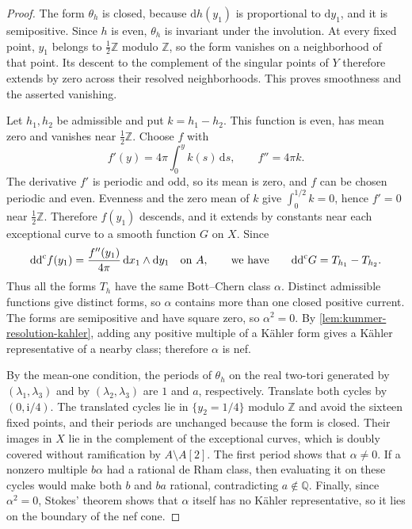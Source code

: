 \begin{proof}
The form $\theta_h$ is closed, because $\mathrm dh(y_1)$ is proportional to $\mathrm dy_1$, and it is semipositive. Since $h$ is even, $\theta_h$ is invariant under the involution. At every fixed point, $y_1$ belongs to $\frac12\mathbb Z$ modulo $\mathbb Z$, so the form vanishes on a neighborhood of that point. Its descent to the complement of the singular points of $Y$ therefore extends by zero across their resolved neighborhoods. This proves smoothness and the asserted vanishing.

Let $h_1,h_2$ be admissible and put $k=h_1-h_2$. This function is even, has mean zero and vanishes near $\frac12\mathbb Z$. Choose $f$ with
\[
 f'(y)=4\pi\int_0^y k(s)\,\mathrm ds,
 \qquad f''=4\pi k.
\]
The derivative $f'$ is periodic and odd, so its mean is zero, and $f$ can be chosen periodic and even. Evenness and the zero mean of $k$ give $\int_0^{1/2}k=0$, hence $f'=0$ near $\frac12\mathbb Z$. Therefore $f(y_1)$ descends, and it extends by constants near each exceptional curve to a smooth function $G$ on $X$. Since
\[
 \mathrm{dd}^{\mathrm{c}} f(y_1)=\frac{f''(y_1)}{4\pi}
                    \,\mathrm dx_1\wedge\mathrm dy_1
 \quad\text{on }A,
 \qquad\text{we have}\qquad
 \mathrm{dd}^{\mathrm{c}} G=T_{h_1}-T_{h_2}.
\]
Thus all the forms $T_h$ have the same Bott--Chern class $\alpha$. Distinct admissible functions give distinct forms, so $\alpha$ contains more than one closed positive current. The forms are semipositive and have square zero, so $\alpha^2=0$. By \cref{lem:kummer-resolution-kahler}, adding any positive multiple of a K\"ahler form gives a K\"ahler representative of a nearby class; therefore $\alpha$ is nef.

By the mean-one condition, the periods of $\theta_h$ on the real two-tori generated by $(\lambda_1,\lambda_3)$ and by $(\lambda_2,\lambda_3)$ are $1$ and $a$, respectively. Translate both cycles by $(0,\mathrm i/4)$. The translated cycles lie in $\{y_2=1/4\}$ modulo $\mathbb Z$ and avoid the sixteen fixed points, and their periods are unchanged because the form is closed. Their images in $X$ lie in the complement of the exceptional curves, which is doubly covered without ramification by $A\setminus A[2]$. The first period shows that $\alpha\ne0$. If a nonzero multiple $b\alpha$ had a rational de Rham class, then evaluating it on these cycles would make both $b$ and $ba$ rational, contradicting $a\notin\mathbb Q$. Finally, since $\alpha^2=0$, Stokes' theorem shows that $\alpha$ itself has no K\"ahler representative, so it lies on the boundary of the nef cone.
\end{proof}
